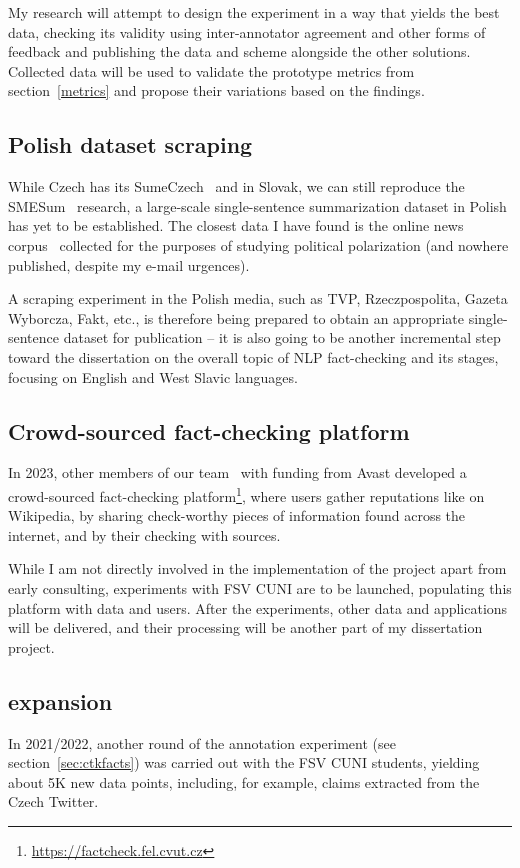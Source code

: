 My research will attempt to design the experiment in a way that yields the best data, checking its validity using inter-annotator agreement and other forms of feedback and publishing the data and scheme alongside the other solutions. 
Collected data will be used to validate the prototype metrics from section~\ref{metrics} and propose their variations based on the findings.

\subsection{Polish dataset scraping}
While Czech has its SumeCzech~\cite{straka-etal-2018-sumeczech} and in Slovak, we can still reproduce the SMESum~\cite{suppa-adamec-2020-summarization} research, a large-scale single-sentence summarization dataset in Polish has yet to be established.
The closest data I have found is the online news corpus~\cite{szwoch-etal-2022-creation} collected for the purposes of studying political polarization (and nowhere published, despite my e-mail urgences).

A scraping experiment in the Polish media, such as TVP, Rzeczpospolita, Gazeta Wyborcza, Fakt, etc., is therefore being prepared to obtain an appropriate single-sentence dataset for publication -- it is also going to be another incremental step toward the dissertation on the overall topic of NLP fact-checking and its stages, focusing on English and West Slavic languages. 

\subsection{Crowd-sourced fact-checking platform}
In 2023, other members of our team~\cite{butora} with funding from Avast developed a crowd-sourced fact-checking platform\footnote{\url{https://factcheck.fel.cvut.cz}}, where users gather reputations like on Wikipedia, by sharing check-worthy pieces of information found across the internet, and by their checking with sources.

While I am not directly involved in the implementation of the project apart from early consulting, experiments with FSV CUNI are to be launched, populating this platform with data and users. 
After the experiments, other data and applications will be delivered, and their processing will be another part of my dissertation project.

\subsection{\CTK expansion}
In 2021/2022, another round of the \CTK annotation experiment (see section~\ref{sec:ctkfacts}) was carried out with the FSV CUNI students, yielding about 5K new data points, including, for example, claims extracted from the Czech Twitter.

